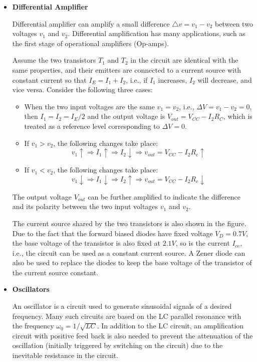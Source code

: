 \begin{itemize}

\item {\bf Differential Amplifier}

Differential amplifier can amplify a small difference $\triangle v=v_1-v_2$ 
between two voltages $v_1$ and $v_2$. Differential amplification has many 
applications, such as the first stage of operational amplifiers (Op-amps).

Assume the two transistors $T_1$ and $T_2$ in the circuit are identical with
the same properties, and their emitters are connected to a current source
with constant current so that $I_E=I_1+I_2$, i.e., if $I_1$ increases, $I_2$
will decrease, and vice versa. Consider the following three cases:
\begin{itemize}
\item When the two input voltages are the same $v_1=v_2$, i.e., $\Delta V=v_1-v_2=0$,
  then $I_1=I_2=I_E/2$ and the output voltage is $V_{out}=V_{CC}-I_2 R_C$, which
  is treated as a reference level corresponding to $\Delta V=0$.
\item If $v_1>v_2$, the following changes take place:
  \[ v_1 \uparrow \Longrightarrow I_1 \uparrow \Longrightarrow I_2 
  \downarrow \Longrightarrow v_{out}=V_{CC}-I_2 R_c \uparrow \]
\item If $v_1<v_2$, the following changes take place:
  \[ v_1 \downarrow \Longrightarrow I_1 \downarrow \Longrightarrow I_2 
  \uparrow \Longrightarrow v_{out}=V_{CC}-I_2 R_c \downarrow \]
\end{itemize}
The output voltage $V_{out}$ can be further amplified to indicate the 
difference and its polarity between the two input voltages $v_1$ and $v_2$.

The current source shared by the two transistors is also shown in the 
figure. Due to the fact that the forward biased diodes have fixed voltage
$V_D=0.7V$, the base voltage of the transistor is also fixed at $2.1V$, so
is the current $I_{ce}$, i.e., the circuit can be used as a constant current
source. A Zener diode can also be used to replace the diodes to keep the base
voltage of the transistor of the current source constant.


\item {\bf Oscillators}

  An oscillator is a circuit used to generate sinusoidal signals of a desired 
  frequency. Many such circuits are based on the LC parallel resonance with the
  frequency $\omega_0=1/\sqrt{LC}$. In addition to the LC circuit, an amplification
  circuit with positive feed back is also needed to prevent the attenuation of the 
  oscillation (initially triggered by switching on the circuit) due to the inevitable 
  resistance in the circuit. 


\end{itemize}
